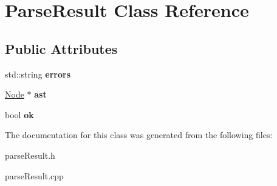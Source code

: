 \hypertarget{classParseResult}{\section{Parse\-Result Class Reference}
\label{classParseResult}
}
\subsection*{Public Attributes}
\begin{DoxyCompactItemize}
\item 
\hypertarget{classParseResult_ab2dd8deb95c5177148f488ca5d31307a}{std\-::string {\bfseries errors}}\label{classParseResult_ab2dd8deb95c5177148f488ca5d31307a}

\item 
\hypertarget{classParseResult_aa04c6ed3cba109f276e5bc089ca2ff15}{\hyperlink{classNode}{Node} $\ast$ {\bfseries ast}}\label{classParseResult_aa04c6ed3cba109f276e5bc089ca2ff15}

\item 
\hypertarget{classParseResult_a64eb6658c1fc5bbf35fdce181f6845d5}{bool {\bfseries ok}}\label{classParseResult_a64eb6658c1fc5bbf35fdce181f6845d5}

\end{DoxyCompactItemize}


The documentation for this class was generated from the following files\-:\begin{DoxyCompactItemize}
\item 
parse\-Result.\-h\item 
parse\-Result.\-cpp\end{DoxyCompactItemize}
